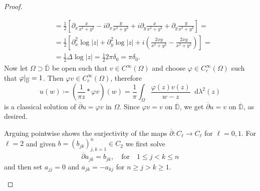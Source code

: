 \documentclass[letterpaper, 11pt]{article}
\newcommand{\D}{\mathbb{D}}
\newcommand{\1}{\mathds{1}}
\newcommand{\dd}{\mathop{}\!\mathrm{d}}
\newcommand{\cl}[1]{\overline{#1}}
\newcommand{\restr}[2]{{%
  \left.\kern-\nulldelimiterspace %
  #1 %
  \littletaller %
  \right|_{#2} %
  }}
\newcommand{\littletaller}{\mathchoice{\vphantom{\big|}}{}{}{}}
\newcommand{\wirtzbar}{\overline{\partial}}
\theoremstyle{definition}
\begin{document}
\begin{proof}{\ }
\begin{enumerate}
\begin{align*}
      &= \frac{1}{2} \left[ \partial_x \frac{x}{x^2 + y^2} - i \partial_x \frac{y}{x^2 + y^2} + i \partial_y \frac{x}{x^2 + y^2} + \partial_y \frac{y}{x^2 + y^2} \right] = \\
      &= \frac{1}{2} \left[ \partial^2_x \log \vert z \vert + \partial^2_y \log \vert z \vert + i \left( \frac{2xy}{x^2 + y^2} - \frac{2xy}{x^2 + y^2} \right) \right] = \\
      &= \frac{1}{2} \Delta \log \vert z \vert = \frac{1}{2} 2 \pi \delta_0 = \pi \delta_0.
    \end{align*}
    Now let $\Omega \supset \cl{\D}$ be open such that $v \in C^\infty(\Omega)$ and choose $\varphi \in C_c^\infty(\Omega)$ such that $\restr{\varphi}{\cl{\D}} = 1$. Then $\varphi v \in C_c^\infty(\Omega)$, therefore
    $$ u(w) \coloneqq \left(\frac{1}{\pi z} \ast \varphi v\right)(w) = \frac{1}{\pi} \int_\Omega \frac{\varphi(z) v(z)}{w - z} \dd \lambda^2(z) $$
    is a classical solution of $\wirtzbar u = \varphi v$ in $\Omega$. Since $\varphi v = v$ on $\cl{\D}$, we get $\wirtzbar u = v$ on $\cl\D$, as desired.

    Arguing pointwise shows the surjectivity of the maps $\wirtzbar : C_\ell \to C_\ell$ for $\ell = 0, 1$. For $\ell = 2$ and given $b = (b_{jk})_{j,k=1}^n \in C_2$ we first solve
    $$ \wirtzbar a_{jk} = b_{jk}, \quad \textrm{for} \quad 1 \leq j < k \leq n $$
    and then set $a_{jj} = 0$ and $a_{jk} = -a_{kj}$ for $n \geq j > k \geq 1$.
  \end{enumerate}
\end{proof}
\end{document}

